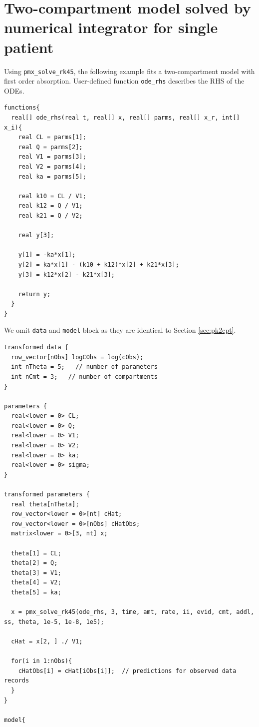 \documentclass[10pt, reqno, oneside]{amsbook}
\numberwithin{equation}{chapter}
\numberwithin{figure}{chapter}
\numberwithin{table}{chapter}
\theoremstyle{remark}
\begin{document}
\section{Two-compartment model solved by numerical integrator for single patient}
\label{sec:org90b8c20}
Using \texttt{pmx\_solve\_rk45}, the following example fits a two-compartment model
with first order absorption. User-defined function
\texttt{ode\_rhs} describes the RHS of the ODEs. 
\begin{verbatim}
functions{
  real[] ode_rhs(real t, real[] x, real[] parms, real[] x_r, int[] x_i){
    real CL = parms[1];
    real Q = parms[2];
    real V1 = parms[3];
    real V2 = parms[4];
    real ka = parms[5];

    real k10 = CL / V1;
    real k12 = Q / V1;
    real k21 = Q / V2;

    real y[3];

    y[1] = -ka*x[1];
    y[2] = ka*x[1] - (k10 + k12)*x[2] + k21*x[3];
    y[3] = k12*x[2] - k21*x[3];

    return y;
  }
}
\end{verbatim}

We omit \texttt{data} and
\texttt{model} block as they are identical to Section \ref{sec:pk2cpt}.

\begin{verbatim}
transformed data {
  row_vector[nObs] logCObs = log(cObs);
  int nTheta = 5;   // number of parameters
  int nCmt = 3;   // number of compartments
}

parameters {
  real<lower = 0> CL;
  real<lower = 0> Q;
  real<lower = 0> V1;
  real<lower = 0> V2;
  real<lower = 0> ka;
  real<lower = 0> sigma;
}

transformed parameters {
  real theta[nTheta];
  row_vector<lower = 0>[nt] cHat;
  row_vector<lower = 0>[nObs] cHatObs;
  matrix<lower = 0>[3, nt] x; 

  theta[1] = CL;
  theta[2] = Q;
  theta[3] = V1;
  theta[4] = V2;
  theta[5] = ka;

  x = pmx_solve_rk45(ode_rhs, 3, time, amt, rate, ii, evid, cmt, addl, ss, theta, 1e-5, 1e-8, 1e5);

  cHat = x[2, ] ./ V1;

  for(i in 1:nObs){
    cHatObs[i] = cHat[iObs[i]];  // predictions for observed data records
  }
}

model{
\end{verbatim}
\end{document}
